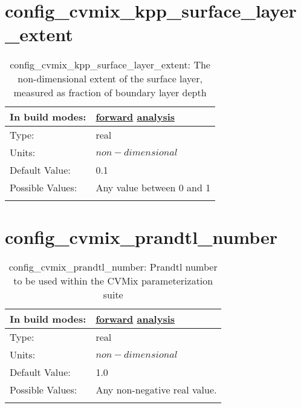 \section[config\_cvmix\_kpp\_surface\_layer\_extent]{config\_cvmix\_kpp\_surface\_layer\_extent}
\label{sec:nm_sec_config_cvmix_kpp_surface_layer_extent}
\begin{center}
\begin{longtable}{| p{2.0in} || p{4.0in} |}
    \hline
    In build modes: & \hyperref[subsec:forward_nm_tab_cvmix]{forward} \hyperref[subsec:analysis_nm_tab_cvmix]{analysis} \\
    \hline
    Type: & real \\
    \hline
    Units: & $non-dimensional$ \\
    \hline
    Default Value: & 0.1 \\
    \hline
    Possible Values: & Any value between 0 and 1 \\
    \hline
    \caption{config\_cvmix\_kpp\_surface\_layer\_extent: The non-dimensional extent of the surface layer, measured as fraction of boundary layer depth}
\end{longtable}
\end{center}
\section[config\_cvmix\_prandtl\_number]{config\_cvmix\_prandtl\_number}
\label{sec:nm_sec_config_cvmix_prandtl_number}
\begin{center}
\begin{longtable}{| p{2.0in} || p{4.0in} |}
    \hline
    In build modes: & \hyperref[subsec:forward_nm_tab_cvmix]{forward} \hyperref[subsec:analysis_nm_tab_cvmix]{analysis} \\
    \hline
    Type: & real \\
    \hline
    Units: & $non-dimensional$ \\
    \hline
    Default Value: & 1.0 \\
    \hline
    Possible Values: & Any non-negative real value. \\
    \hline
    \caption{config\_cvmix\_prandtl\_number: Prandtl number to be used within the CVMix parameterization suite}
\end{longtable}
\end{center}
